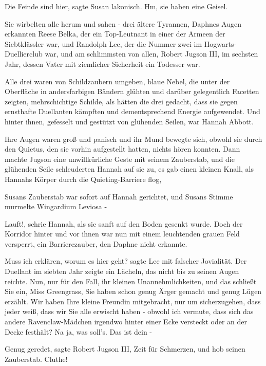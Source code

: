 \glqq{}Die Feinde sind hier\grqq{}, sagte Susan lakonisch. \glqq{}Hm, sie haben
eine Geisel.\grqq{}

Sie wirbelten alle herum und sahen - drei ältere Tyrannen, Daphnes Augen
erkannten Reese Belka, der ein Top-Leutnant in einer der Armeen der
Siebtklässler war, und Randolph Lee, der die Nummer zwei im
Hogwarts-Duellierclub war, und am schlimmsten von allen, Robert Jugson III, im
sechsten Jahr, dessen Vater mit ziemlicher Sicherheit ein Todesser war.

Alle drei waren von Schildzaubern umgeben, blaue Nebel, die unter der Oberfläche
in andersfarbigen Bändern glühten und darüber gelegentlich Facetten zeigten,
mehrschichtige Schilde, als hätten die drei gedacht, dass sie gegen ernsthafte
Duellanten kämpften und dementsprechend Energie aufgewendet. Und hinter ihnen,
gefesselt und gestützt von glühenden Seilen, war Hannah Abbott.

Ihre Augen waren groß und panisch und ihr Mund bewegte sich, obwohl sie durch
den Quietus, den sie vorhin aufgestellt hatten, nichts hören konnten. Dann
machte Jugson eine unwillkürliche Geste mit seinem Zauberstab, und die glühenden
Seile schleuderten Hannah auf sie zu, es gab einen kleinen Knall, als Hannahs
Körper durch die Quieting-Barriere flog,

Susans Zauberstab war sofort auf Hannah gerichtet, und Susans Stimme murmelte
\glqq{}Wingardium Leviosa\grqq{} -

\glqq{}Lauft!\grqq{}, schrie Hannah, als sie sanft auf den Boden gesenkt wurde.
Doch der Korridor hinter und vor ihnen war nun mit einem leuchtenden grauen Feld
versperrt, ein Barrierezauber, den Daphne nicht erkannte.

\glqq{}Muss ich erklären, worum es hier geht?\grqq{} sagte Lee mit falscher
Jovialität. Der Duellant im siebten Jahr zeigte ein Lächeln, das nicht bis zu
seinen Augen reichte. \glqq{}Nun, nur für den Fall, ihr kleinen
Unannehmlichkeiten, und das schließt Sie ein, Miss Greengrass, Sie haben schon
genug Ärger gemacht und genug Lügen erzählt. Wir haben Ihre kleine Freundin
mitgebracht, nur um sicherzugehen, dass jeder weiß, dass wir Sie alle erwischt
haben - obwohl ich vermute, dass sich das andere Ravenclaw-Mädchen irgendwo
hinter einer Ecke versteckt oder an der Decke festhält? Na ja, was soll's. Das
ist dein -\grqq{}

\glqq{}Genug geredet\grqq{}, sagte Robert Jugson III, \glqq{}Zeit für
Schmerzen\grqq{}, und hob seinen Zauberstab. \glqq{}Cluthe!\grqq{}

